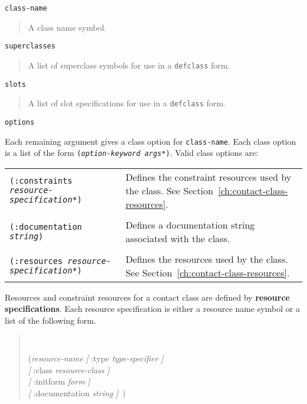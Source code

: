 \documentclass[twoside]{book}
\begin{document}
\begin{sloppy}
\begin{flushright}
\parbox[t]{6.125in}{
{\tt class-name}
\begin{quote}
A class name symbol.  
\end{quote}
}
 
\parbox[t]{6.125in}{
{\tt superclasses}
\begin{quote}
A list of superclass symbols for use in a {\tt defclass} form. 
\end{quote}
}

\parbox[t]{6.125in}{
{\tt slots}
\begin{quote}
A list of slot specifications for use in a {\tt defclass} form. 
\end{quote}
}

\parbox[t]{6.125in}{
{\tt options}
}

\parbox[t]{5.75in}{
Each  remaining argument gives a class option for {\tt class-name}.
Each class option is a list of the form {\tt ({\em option-keyword
args*})}. Valid class options are: 

\begin{center}
\begin{tabular}{lp{2.5in}}
{\tt (:constraints {\em resource-specification*})} & 
Defines the constraint resources used by the class. See
Section~\ref{ch:contact-class-resources}.\index{resource} \\ \\

{\tt (:documentation {\em string})} & 
Defines a documentation string associated with the class.\\ \\

{\tt (:resources {\em resource-specification*})} & 
Defines the resources used by the class. See
Section~\ref{ch:contact-class-resources}.\index{resource} \\
\end{tabular}
\end{center}
}
\end{flushright}

Resources and constraint resources for a contact class are defined by
{\bf resource specifications}. Each resource
specification 
is either a resource name symbol or a list of the following form.
\begin{quotation}
\tt
\begin{tabbing}
({\em resource-name} \= {\em [} :type {\em type-specifier} {\em ]}\\
\> {\em [} :class {\em resource-class} {\em ]}\\
\> {\em [} :initform {\em form} {\em ]} \\
\> {\em [} :documentation {\em string} {\em ]}\ )
\end{tabbing}
\end{quotation}



\end{sloppy}
\end{document}
